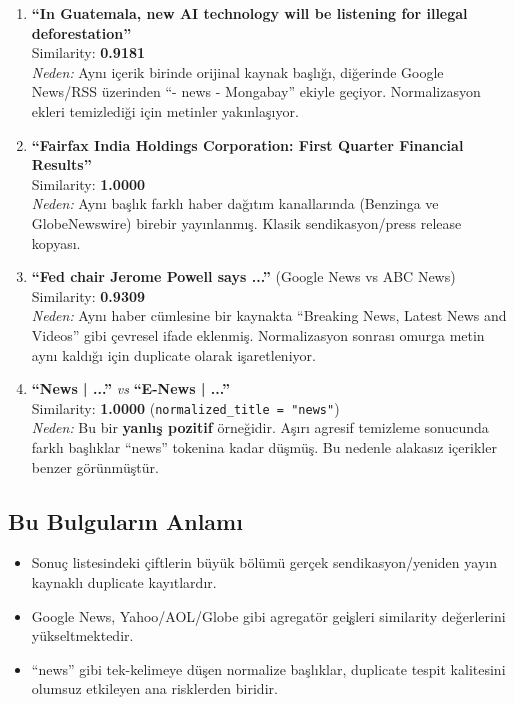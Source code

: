 \documentclass[12pt,a4paper]{article}
\begin{document}
\begin{enumerate}
    \item \textbf{``In Guatemala, new AI technology will be listening for illegal deforestation''} \\
    Similarity: \textbf{0.9181} \\
    \textit{Neden:} Ayn\i{} i\c{c}erik birinde orijinal kaynak ba\c{s}l\i{}\u{g}\i{}, di\u{g}erinde Google News/RSS \"uzerinden ``- news - Mongabay'' ekiyle ge\c{c}iyor. Normalizasyon ekleri temizledi\u{g}i i\c{c}in metinler yak\i{}nla\c{s}\i{}yor.

    \item \textbf{``Fairfax India Holdings Corporation: First Quarter Financial Results''} \\
    Similarity: \textbf{1.0000} \\
    \textit{Neden:} Ayn\i{} ba\c{s}l\i{}k farkl\i{} haber da\u{g}\i{}t\i{}m kanallar\i{}nda (Benzinga ve GlobeNewswire) birebir yay\i{}nlanm\i{}\c{s}. Klasik sendikasyon/press release kopyas\i{}.

    \item \textbf{``Fed chair Jerome Powell says ...''} (Google News vs ABC News) \\
    Similarity: \textbf{0.9309} \\
    \textit{Neden:} Ayn\i{} haber c\"umlesine bir kaynakta ``Breaking News, Latest News and Videos'' gibi \c{c}evresel ifade eklenmi\c{s}. Normalizasyon sonras\i{} omurga metin ayn\i{} kald\i{}\u{g}\i{} i\c{c}in duplicate olarak i\c{s}aretleniyor.

    \item \textbf{``News | ...''} \textit{vs} \textbf{``E-News | ...''} \\
    Similarity: \textbf{1.0000} (\texttt{normalized\_title = "news"}) \\
    \textit{Neden:} Bu bir \textbf{yanl\i{}\c{s} pozitif} \"orne\u{g}idir. A\c{s}\i{}r\i{} agresif temizleme sonucunda farkl\i{} ba\c{s}l\i{}klar ``news'' tokenina kadar d\"u\c{s}m\"u\c{s}. Bu nedenle alakas\i{}z i\c{c}erikler benzer g\"or\"unm\"u\c{s}t\"ur.
\end{enumerate}

\subsection{Bu Bulgular\i{}n Anlam\i{}}
\begin{itemize}
    \item Sonu\c{c} listesindeki \c{c}iftlerin b\"uy\"uk b\"ol\"um\"u ger\c{c}ek sendikasyon/yeniden yay\i{}n kaynakl\i{} duplicate kay\i{}tlard\i{}r.
    \item Google News, Yahoo/AOL/Globe gibi agregat\"or ge\c{i}\c{s}leri similarity de\u{g}erlerini y\"ukseltmektedir.
    \item ``news'' gibi tek-kelimeye d\"u\c{s}en normalize ba\c{s}l\i{}klar, duplicate tespit kalitesini olumsuz etkileyen ana risklerden biridir.
\end{itemize}
\end{document}

